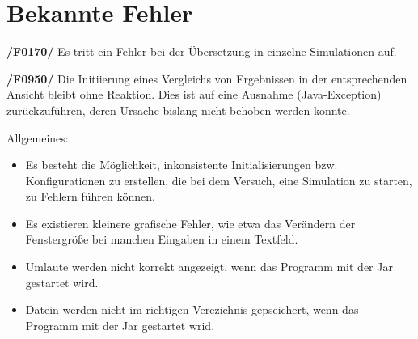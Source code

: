 \section{Bekannte Fehler}

\textbf{/F0170/}
Es tritt ein Fehler bei der Übersetzung in einzelne Simulationen auf.

\textbf{/F0950/}
Die Initiierung eines Vergleichs von Ergebnissen in der entsprechenden Ansicht bleibt ohne Reaktion. Dies ist auf eine Ausnahme (Java-Exception) zurückzuführen, deren Ursache bislang nicht behoben werden konnte.

Allgemeines:
\begin{itemize}
\item Es besteht die Möglichkeit, inkonsistente Initialisierungen bzw. Konfigurationen zu erstellen, die bei dem Versuch, eine Simulation zu starten, zu Fehlern führen können.

\item Es existieren kleinere grafische Fehler, wie etwa das Verändern der Fenstergröße bei manchen Eingaben in einem Textfeld.

\item Umlaute werden nicht korrekt angezeigt, wenn das Programm mit der Jar gestartet wird.

\item Datein werden nicht im richtigen Verezichnis gepseichert, wenn das Programm mit der Jar gestartet wrid.
\end{itemize}